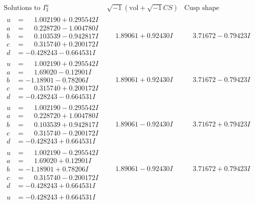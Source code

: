 \documentclass[1p]{elsarticle_modified}
\theoremstyle{definition}
\newcommand{\I}{\sqrt{-1}}
\begin{document}
$$\begin{array}{c|c|c}  
\text{Solutions to }I^u_{3}& \I (\text{vol} + \sqrt{-1}CS) & \text{Cusp shape}\\
 \hline 
\begin{aligned}
u &= \phantom{-}1.002190 + 0.295542 I \\
a &= \phantom{-}0.228720 - 1.004780 I \\
b &= \phantom{-}0.103539 - 0.942817 I \\
c &= \phantom{-}0.315740 + 0.200172 I \\
d &= -0.428243 - 0.664531 I\end{aligned}
 & \phantom{-}1.89061 + 0.92430 I & \phantom{-}3.71672 - 0.79423 I \\ \hline\begin{aligned}
u &= \phantom{-}1.002190 + 0.295542 I \\
a &= \phantom{-}1.69020 - 0.12901 I \\
b &= -1.18901 - 0.78206 I \\
c &= \phantom{-}0.315740 + 0.200172 I \\
d &= -0.428243 - 0.664531 I\end{aligned}
 & \phantom{-}1.89061 + 0.92430 I & \phantom{-}3.71672 - 0.79423 I \\ \hline\begin{aligned}
u &= \phantom{-}1.002190 - 0.295542 I \\
a &= \phantom{-}0.228720 + 1.004780 I \\
b &= \phantom{-}0.103539 + 0.942817 I \\
c &= \phantom{-}0.315740 - 0.200172 I \\
d &= -0.428243 + 0.664531 I\end{aligned}
 & \phantom{-}1.89061 - 0.92430 I & \phantom{-}3.71672 + 0.79423 I \\ \hline\begin{aligned}
u &= \phantom{-}1.002190 - 0.295542 I \\
a &= \phantom{-}1.69020 + 0.12901 I \\
b &= -1.18901 + 0.78206 I \\
c &= \phantom{-}0.315740 - 0.200172 I \\
d &= -0.428243 + 0.664531 I\end{aligned}
 & \phantom{-}1.89061 - 0.92430 I & \phantom{-}3.71672 + 0.79423 I \\ \hline\begin{aligned}
u &= -0.428243 + 0.664531 I \\

\end{aligned}
\end{array}$$
\end{document}
